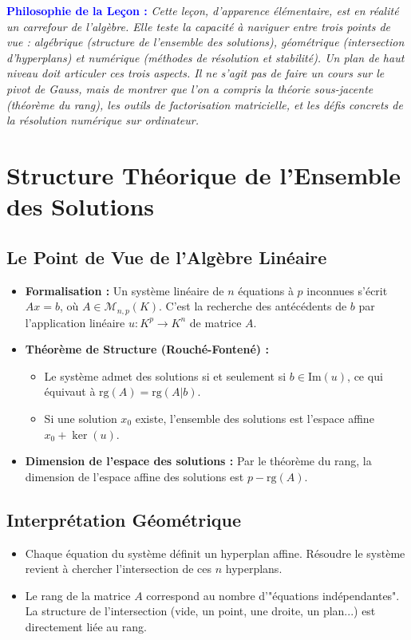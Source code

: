 \documentclass[12pt, a4paper, parskip=full]{report}
\theoremstyle{agregstyle}
\newenvironment{philosophie}
  {\par\medskip\noindent\begin{oframed}\noindent\textbf{\textcolor{blue}{Philosophie de la Leçon :}}\itshape}
  {\end{oframed}\par\medskip}
\begin{document}
\begin{philosophie}
    Cette leçon, d'apparence élémentaire, est en réalité un carrefour de l'algèbre. Elle teste la capacité à naviguer entre trois points de vue : algébrique (structure de l'ensemble des solutions), géométrique (intersection d'hyperplans) et numérique (méthodes de résolution et stabilité). Un plan de haut niveau doit articuler ces trois aspects. Il ne s'agit pas de faire un cours sur le pivot de Gauss, mais de montrer que l'on a compris la théorie sous-jacente (théorème du rang), les outils de factorisation matricielle, et les défis concrets de la résolution numérique sur ordinateur.
\end{philosophie}

\section{Structure Théorique de l'Ensemble des Solutions}

\subsection{Le Point de Vue de l'Algèbre Linéaire}
\begin{itemize}
    \item \textbf{Formalisation :} Un système linéaire de $n$ équations à $p$ inconnues s'écrit $Ax=b$, où $A \in \mathcal{M}_{n,p}(K)$. C'est la recherche des antécédents de $b$ par l'application linéaire $u: K^p \to K^n$ de matrice $A$.
    \item \textbf{Théorème de Structure (Rouché-Fontené) :}
        \begin{itemize}
            \item Le système admet des solutions si et seulement si $b \in \mathrm{Im}(u)$, ce qui équivaut à $\mathrm{rg}(A) = \mathrm{rg}(A|b)$.
            \item Si une solution $x_0$ existe, l'ensemble des solutions est l'espace affine $x_0 + \ker(u)$.
        \end{itemize}
    \item \textbf{Dimension de l'espace des solutions :} Par le théorème du rang, la dimension de l'espace affine des solutions est $p - \mathrm{rg}(A)$.
\end{itemize}

\subsection{Interprétation Géométrique}
\begin{itemize}
    \item Chaque équation du système définit un hyperplan affine. Résoudre le système revient à chercher l'intersection de ces $n$ hyperplans.
    \item Le rang de la matrice $A$ correspond au nombre d'"équations indépendantes". La structure de l'intersection (vide, un point, une droite, un plan...) est directement liée au rang.
\end{itemize}
\end{document}
